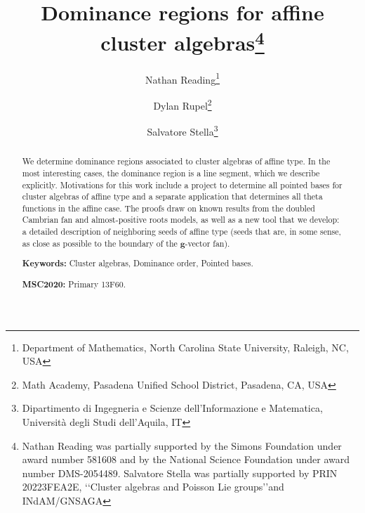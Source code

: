 \documentclass[10pt]{article}
\title{Dominance regions for affine cluster algebras\thanks{Nathan Reading was partially supported by the Simons Foundation under award number 581608 and by the National Science Foundation under award number DMS-2054489. Salvatore Stella was partially supported by PRIN 20223FEA2E, \lq\lq Cluster algebras and Poisson Lie groups\rq\rq and INdAM/GNSAGA}}
\author{Nathan Reading\thanks{Department of Mathematics, North Carolina State University, Raleigh, NC, USA} \and
Dylan Rupel\thanks{Math Academy, Pasadena Unified School District, Pasadena, CA, USA} \and
Salvatore Stella\thanks{Dipartimento di Ingegneria e Scienze dell'Informazione e Matematica, Universit\`{a} degli Studi dell'Aquila, IT}}
\theoremstyle{definition}
\theoremstyle{remark}
\numberwithin{equation}{section}
\newcommand{\0}{{\mathbf{0}}}
\newcommand{\g}{\mathbf{g}}
\begin{document}
\maketitle

\begin{abstract}
We determine dominance regions associated to cluster algebras of affine type.
In the most interesting cases, the dominance region is a line segment, which we describe explicitly.
Motivations for this work include a project to determine all pointed bases for cluster algebras of affine type and a separate application that determines all theta functions in the affine case.
The proofs draw on known results from the doubled Cambrian fan and almost-positive roots models, as well as a new tool that we develop: a detailed description of neighboring seeds of affine type (seeds that are, in some sense, as close as possible to the boundary of the $\g$-vector fan).
\vspace{1em}

\noindent \textbf{Keywords:} Cluster algebras, Dominance order, Pointed bases.

\noindent \textbf{MSC2020:} Primary 13F60.
\end{abstract}


\setcounter{tocdepth}{2}
\tableofcontents
\end{document}
